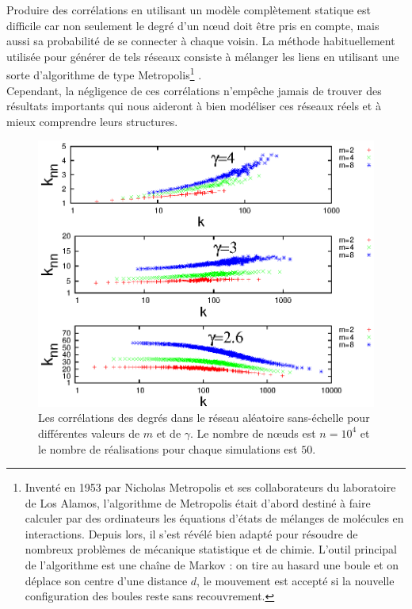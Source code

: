 Produire des corrélations en utilisant un modèle complètement statique est difficile car non seulement le degré d'un nœud doit être pris en compte, mais aussi sa probabilité de se connecter à chaque voisin. La méthode habituellement utilisée pour générer de tels réseaux consiste à mélanger les liens en utilisant une sorte d'algorithme de type Metropolis\footnote{Inventé en 1953 par Nicholas Metropolis et ses collaborateurs du laboratoire de Los Alamos, l'algorithme de Metropolis était d'abord destiné à faire calculer par des ordinateurs les équations d'états de mélanges de molécules en interactions. Depuis lors, il s'est révélé bien adapté pour résoudre de nombreux problèmes de mécanique statistique et de chimie. L'outil principal de l'algorithme est une chaîne de Markov : on tire au hasard une boule et on déplace son centre d'une distance $d$, le mouvement est accepté si la nouvelle configuration des boules reste sans recouvrement.} \cite{Metropolis-al1953}.\\ Cependant, la négligence de ces corrélations n'empêche jamais de trouver des résultats importants qui nous aideront à bien modéliser ces réseaux réels et à mieux comprendre leurs structures. 
\begin{figure}[h!]
	\centering
	\includegraphics[scale=1.2]{./figures/correlation}
	\caption{Les corrélations des degrés dans le réseau aléatoire sans-échelle pour différentes valeurs de $m$ et de $\gamma$. Le nombre de nœuds est $n=10^4$ et le nombre de réalisations pour chaque simulations est $50$.}
	\label{correlation}
\end{figure}
\vspace{3cm}


